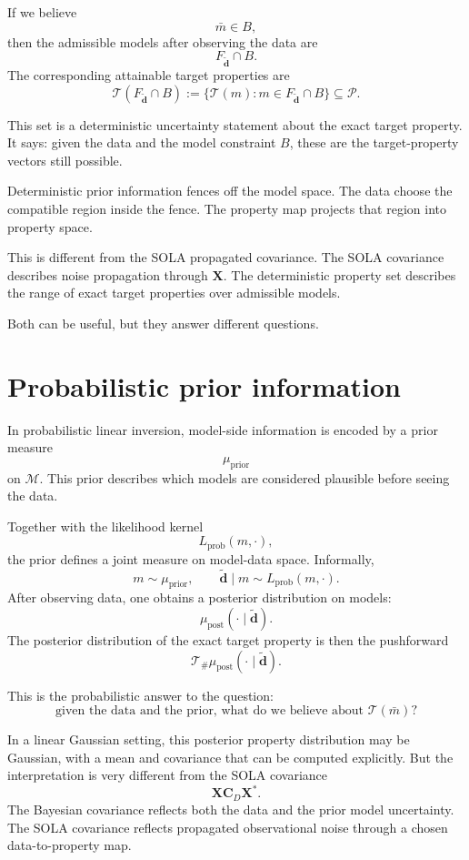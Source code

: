 \documentclass[11pt,openany]{book}
\theoremstyle{definition}
\theoremstyle{remark}
\newcommand{\M}{\mathcal M}
\newcommand{\Pspace}{\mathcal P}
\newcommand{\Tau}{\mathcal{T}}
\begin{document}
If we believe
\[
  \bar m\in B,
\]
then the admissible models after observing the data are
\[
  F_{\widetilde{\mathbf d}}\cap B.
\]
The corresponding attainable target properties are
\[
  \Tau(F_{\widetilde{\mathbf d}}\cap B)
  :=
  \{\Tau(m):m\in F_{\widetilde{\mathbf d}}\cap B\}
  \subseteq\Pspace.
\]

This set is a deterministic uncertainty statement about the exact target property. It says:
given the data and the model constraint \(B\), these are the target-property vectors still
possible.

\begin{intuitionbox}
Deterministic prior information fences off the model space. The data choose the compatible
region inside the fence. The property map projects that region into property space.
\end{intuitionbox}

This is different from the SOLA propagated covariance. The SOLA covariance describes noise
propagation through \(\mathbf X\). The deterministic property set describes the range of exact
target properties over admissible models.

Both can be useful, but they answer different questions.

\section{Probabilistic prior information}

In probabilistic linear inversion, model-side information is encoded by a prior measure
\[
  \mu_{\mathrm{prior}}
\]
on \(\M\). This prior describes which models are considered plausible before seeing the data.

Together with the likelihood kernel
\[
  L_{\mathrm{prob}}(m,\cdot),
\]
the prior defines a joint measure on model-data space. Informally,
\[
  m\sim\mu_{\mathrm{prior}},
  \qquad
  \widetilde{\mathbf d}\mid m\sim L_{\mathrm{prob}}(m,\cdot).
\]
After observing data, one obtains a posterior distribution on models:
\[
  \mu_{\mathrm{post}}(\cdot\mid \widetilde{\mathbf d}).
\]
The posterior distribution of the exact target property is then the pushforward
\[
  \Tau_{\#}\mu_{\mathrm{post}}(\cdot\mid \widetilde{\mathbf d}).
\]

This is the probabilistic answer to the question:
\[
  \text{given the data and the prior, what do we believe about }\Tau(\bar m)?
\]

In a linear Gaussian setting, this posterior property distribution may be Gaussian, with a mean
and covariance that can be computed explicitly. But the interpretation is very different from
the SOLA covariance
\[
  \mathbf X\mathbf C_D\mathbf X^*.
\]
The Bayesian covariance reflects both the data and the prior model uncertainty. The SOLA
covariance reflects propagated observational noise through a chosen data-to-property map.
\end{document}
